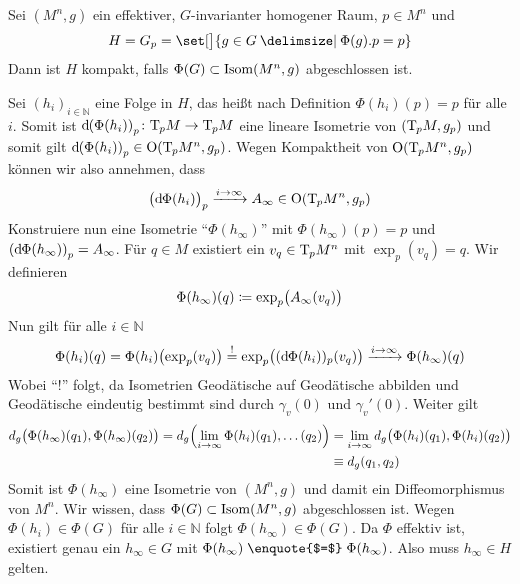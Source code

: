 \begin{lemma}[{name=[Kompaktheit der Standgruppe]},label=lem:319]
	Sei $(M^n,g)$ ein effektiver, $G$-invarianter homogener Raum, $p \in M^n$ und 
	\[
		H = G_p = \set[\big]{g \in G \given \Phi(g) .p = p}
	\]
	Dann ist $H$ kompakt, falls $\Phi(G) \subset \Isom(M^n,g)$ abgeschlossen ist.
\end{lemma}
\begin{beweis}
	Sei $(h_i)_{i \in \mathbb{N}}$ eine Folge in $H$, das heißt nach Definition $\Phi(h_i)(p)=p$ für alle $i$.
	Somit ist $\mathd \enbrace*{\Phi(h_i)}_p \colon \Tmap_p M \to \Tmap_p M$ eine lineare Isometrie von $(\Tmap_p M, g_p)$ und somit gilt $\mathd  \enbrace*{\Phi(h_i)}_p \in \On \enbrace*{\Tmap_p M^n,g_p}$.
	Wegen Kompaktheit von $\On \enbrace*{\Tmap_p M^n,g_p}$ können wir also annehmen, dass
	\[
		\enbrace[\big]{\mathd\Phi(h_i)}_p \grenzw{i \to \infty} A_\infty \in \On \enbrace*{\Tmap_p M^n,g_p}
	\]
	Konstruiere nun eine Isometrie \enquote{$\Phi(h_\infty)$} mit $\Phi(h_\infty)(p)=p$ und $\enbrace*{\mathd\Phi(h_\infty)}_p = A_\infty$.
	Für $q \in M$ existiert ein $v_q \in \Tmap_p M^n$ mit $\exp_p(v_q) =q$.
	Wir definieren
	\[
		\Phi(h_\infty)(q) \coloneqq \exp_p \enbrace[\big]{A_\infty(v_q)}
	\]
	Nun gilt für alle $i \in \mathbb{N}$ 
	\[
		\Phi(h_i)(q) = \Phi(h_i) \enbrace[\big]{\exp_p(v_q)} \stackrel{!}{=} \exp_p \enbrace[\big]{ (\mathd \Phi(h_i))_p (v_q)} \grenzw{i \to \infty} \Phi(h_\infty)(q)
	\]
	Wobei \enquote{!} folgt, da Isometrien Geodätische auf Geodätische abbilden und Geodätische eindeutig bestimmt  sind durch $\gamma_v(0)$ und $\gamma_v'(0)$.
	Weiter gilt
	\begin{align}
		d_g \enbrace[\big]{\Phi(h_\infty)(q_1), \Phi(h_\infty)(q_2)} = d_g \enbrace*{\lim_{i \to \infty} \Phi(h_i)(q_1), \ldots (q_2)} &= \lim_{i \to \infty} d_g \enbrace[\big]{\Phi(h_i)(q_1), \Phi(h_i)(q_2)} \\
		&\equiv d_g(q_1,q_2)
	\end{align}
	Somit ist $\Phi(h_\infty)$ eine Isometrie von $(M^n,g)$ und damit ein Diffeomorphismus von $M^n$.
	Wir wissen, dass $\Phi(G) \subset \Isom(M^n,g)$ abgeschlossen ist.
	Wegen $\Phi(h_i) \in \Phi(G)$ für alle $i \in \mathbb{N}$ folgt $\Phi(h_\infty) \in \Phi(G)$.
	Da $\Phi$ effektiv ist, existiert genau ein $h_\infty \in G$ mit $\Phi(h_\infty) \mathrel{\text{\enquote{$=$}}} \Phi(h_\infty)$.
	Also muss $h_\infty \in H$ gelten.
\end{beweis}

